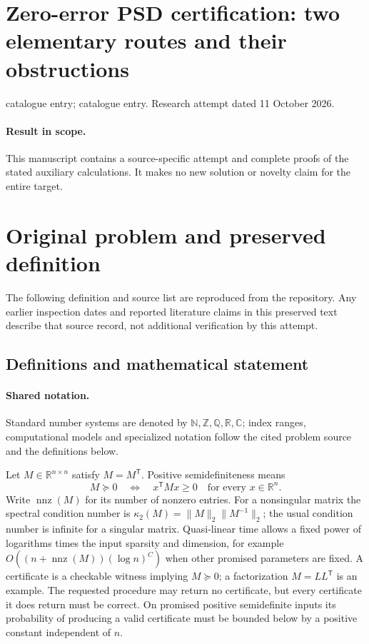 \documentclass[11pt]{article}
\begin{document}
\section*{Zero-error PSD certification: two elementary routes and their obstructions}
\noindent catalogue entry; catalogue entry. Research attempt dated 11 October 2026.
\paragraph{Result in scope.}This manuscript contains a source-specific attempt and complete proofs of the stated auxiliary calculations. It makes no new solution or novelty claim for the entire target.
\section{Original problem and preserved definition}
The following definition and source list are reproduced from the repository. Any earlier inspection dates and reported literature claims in this preserved text describe that source record, not additional verification by this attempt.
\subsection{Definitions and mathematical statement}

\paragraph{Shared notation.}Standard number systems are denoted by $\mathbb N,\mathbb Z,\mathbb Q,\mathbb R,\mathbb C$; index ranges, computational models and specialized notation follow the cited problem source and the definitions below.


Let $M\in\mathbb{R}^{n\times n}$ satisfy $M=M^{\mathsf T}$. Positive semidefiniteness means
\[
 M\succeq0\quad\Longleftrightarrow\quad x^{\mathsf T}Mx\ge0\quad\text{for every }x\in\mathbb{R}^n.
\]
Write $\operatorname{nnz}(M)$ for its number of nonzero entries. For a nonsingular matrix the spectral condition number is $\kappa_2(M)=\|M\|_2\|M^{-1}\|_2$; the usual condition number is infinite for a singular matrix. Quasi-linear time allows a fixed power of logarithms times the input sparsity and dimension, for example $O((n+\operatorname{nnz}(M))(\log n)^C)$ when other promised parameters are fixed. A certificate is a checkable witness implying $M\succeq0$; a factorization $M=LL^{\mathsf T}$ is an example. The requested procedure may return no certificate, but every certificate it does return must be correct. On promised positive semidefinite inputs its probability of producing a valid certificate must be bounded below by a positive constant independent of $n$.
\end{document}
